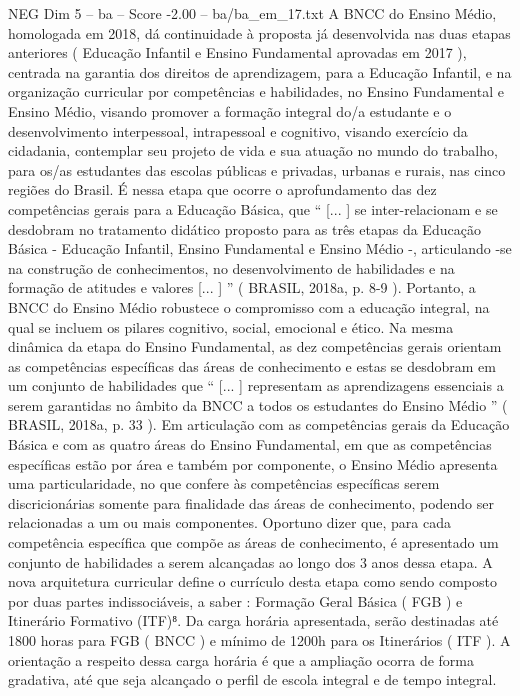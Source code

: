 \begin{textsample}{NEG Dim 5 – ba – Score -2.00 – ba/ba\_em\_17.txt}
A BNCC do Ensino Médio, homologada em 2018, dá continuidade à proposta já desenvolvida nas duas etapas anteriores ( Educação Infantil e Ensino Fundamental aprovadas em 2017 ), centrada na garantia dos direitos de aprendizagem, para a Educação Infantil, e na organização curricular por competências e habilidades, no Ensino Fundamental e Ensino Médio, visando promover a formação integral do/a estudante e o desenvolvimento interpessoal, intrapessoal e cognitivo, visando exercício da cidadania, contemplar seu projeto de vida e sua atuação no mundo do trabalho, para os/as estudantes das escolas públicas e privadas, urbanas e rurais, nas cinco regiões do Brasil.
É nessa etapa que ocorre o aprofundamento das dez competências gerais para a Educação Básica, que “ [... ] se inter-relacionam e se desdobram no tratamento didático proposto para as três etapas da Educação Básica - Educação Infantil, Ensino Fundamental e Ensino Médio -, articulando -se na construção de conhecimentos, no desenvolvimento de habilidades e na formação de atitudes e valores [... ] ” ( BRASIL, 2018a, p. 8-9 ).
Portanto, a BNCC do Ensino Médio robustece o compromisso com a educação integral, na qual se incluem os pilares cognitivo, social, emocional e ético.
Na mesma dinâmica da etapa do Ensino Fundamental, as dez competências gerais orientam as competências específicas das áreas de conhecimento e estas se desdobram em um conjunto de habilidades que “ [... ] representam as aprendizagens essenciais a serem garantidas no âmbito da BNCC a todos os estudantes do Ensino Médio ” ( BRASIL, 2018a, p. 33 ).
Em articulação com as competências gerais da Educação Básica e com as quatro áreas do Ensino Fundamental, em que as competências específicas estão por área e também por componente, o Ensino Médio apresenta uma particularidade, no que confere às competências específicas serem discricionárias somente para finalidade das áreas de conhecimento, podendo ser relacionadas a um ou mais componentes.
Oportuno dizer que, para cada competência específica que compõe as áreas de conhecimento, é apresentado um conjunto de habilidades a serem alcançadas ao longo dos 3 anos dessa etapa.
A nova arquitetura curricular define o currículo desta etapa como sendo composto por duas partes indissociáveis, a saber : Formação Geral Básica ( FGB ) e Itinerário Formativo (ITF)⁸.
Da carga horária apresentada, serão destinadas até 1800 horas para FGB ( BNCC ) e mínimo de 1200h para os Itinerários ( ITF ).
A orientação a respeito dessa carga horária é que a ampliação ocorra de forma gradativa, até que seja alcançado o perfil de escola integral e de tempo integral.

\end{textsample}
